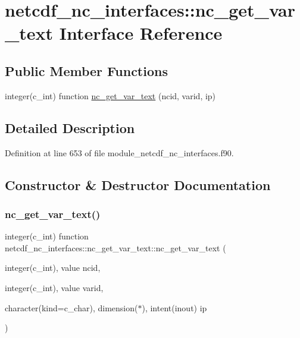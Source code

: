 \hypertarget{interfacenetcdf__nc__interfaces_1_1nc__get__var__text}{}\section{netcdf\+\_\+nc\+\_\+interfaces\+:\+:nc\+\_\+get\+\_\+var\+\_\+text Interface Reference}
\label{interfacenetcdf__nc__interfaces_1_1nc__get__var__text}
\subsection*{Public Member Functions}
\begin{DoxyCompactItemize}
\item 
integer(c\+\_\+int) function \hyperlink{interfacenetcdf__nc__interfaces_1_1nc__get__var__text_a7294e7e9ad2a151ef87cc1de71e96e3f}{nc\+\_\+get\+\_\+var\+\_\+text} (ncid, varid, ip)
\end{DoxyCompactItemize}


\subsection{Detailed Description}


Definition at line 653 of file module\+\_\+netcdf\+\_\+nc\+\_\+interfaces.\+f90.



\subsection{Constructor \& Destructor Documentation}
\mbox{\label{interfacenetcdf__nc__interfaces_1_1nc__get__var__text_a7294e7e9ad2a151ef87cc1de71e96e3f}} 
\subsubsection{\texorpdfstring{nc\+\_\+get\+\_\+var\+\_\+text()}{nc\_get\_var\_text()}}
{\footnotesize\ttfamily integer(c\+\_\+int) function netcdf\+\_\+nc\+\_\+interfaces\+::nc\+\_\+get\+\_\+var\+\_\+text\+::nc\+\_\+get\+\_\+var\+\_\+text (\begin{DoxyParamCaption}\item[{integer(c\+\_\+int), value}]{ncid,  }\item[{integer(c\+\_\+int), value}]{varid,  }\item[{character(kind=c\+\_\+char), dimension($\ast$), intent(inout)}]{ip }\end{DoxyParamCaption})}



